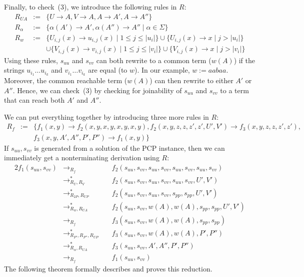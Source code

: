 \documentclass{LMCS}
\theoremstyle{plain}
\begin{document}
Finally, to check~(3), we introduce the following rules in $R$:
\begin{eqnarray}
R_{UA} & := & \{ U \rightarrow A, V \rightarrow A, A \rightarrow A', A\rightarrow A''\}
\nonumber
\\
R_\alpha & := &  \{ \alpha(A')\rightarrow A', \alpha(A'')\rightarrow A'' \mid \alpha\in\Sigma \}
\nonumber
\\
R_w & := & \{U_{i,j}(x)\rightarrow u_{i,j}(x) \mid 1\leq j\leq |u_i|\}
\cup \{U_{i,j}(x)\rightarrow x \mid j>|u_i|\}
\nonumber
\\ & & 
\cup \{V_{i,j}(x)\rightarrow v_{i,j}(x) \mid 1\leq j\leq |v_i|\}
\cup \{V_{i,j}(x)\rightarrow x \mid j>|v_i|\}
\label{eqn-ra}
\end{eqnarray}
Using these rules,
$s_{uu}$ and $s_{vv}$ can both rewrite to a common term 
($w(A)$) if
the strings 
$u_{i_1}\ldots u_{i_k}$ 
and
$v_{i_1}\ldots v_{i_k}$ are equal (to $w$).
In our example, $w := aabaa$.
Moreover, the common reachable term ($w(A)$) can then rewrite to either $A'$ or $A''$.
Hence, we can check~(3) by checking for joinability of $s_{uu}$ and
$s_{vv}$ to a term that can reach both $A'$ and $A''$.

We can put everything together by introducing three more rules in $R$:
\begin{eqnarray}
R_f & := & \{f_1(x,y)\rightarrow f_2(x,y,x,y,x,y,x,y), 
	f_2(x,y,z,z,z',z',U',V')\rightarrow f_3(x,y,z,z,z',z'), 
\nonumber
	\\ & & 
	f_3(x,y,A',A'',P',P'')\rightarrow f_1(x,y) \}
\label{eqn-rf}
\end{eqnarray}
If $s_{uu},s_{vv}$ is generated from a solution of the PCP instance, then
we can immediately get a nonterminating derivation using $R$:
\begin{alignat}{2} f_1(s_{uu},s_{vv}) & \rightarrow_{R_f} &\;&
	f_2(s_{uu},s_{vv},s_{uu},s_{vv},s_{uu},s_{vv},s_{uu},s_{vv})
\nonumber
\\ & \rightarrow_{R_U,R_V}^* &&
	f_2(s_{uu},s_{vv},s_{uu},s_{vv},s_{uu},s_{vv},U',V')
\nonumber
\\ & \rightarrow_{R_{2P},R_{UP}}^* &&
	f_2(s_{uu},s_{vv},s_{uu},s_{vv},s_{pp},s_{pp},U',V')
\nonumber
\\ & \rightarrow_{R_{w},R_{UA}}^* &&
	f_2(s_{uu},s_{vv},w(A),w(A),s_{pp},s_{pp},U',V')
\nonumber
\\ & \rightarrow_{R_{f}} &&
	f_3(s_{uu},s_{vv},w(A),w(A),s_{pp},s_{pp})
\nonumber
\\ & \rightarrow_{R_{P'},R_{P''},R_{UP}}^* &&
	f_3(s_{uu},s_{vv},w(A),w(A),P',P'')
\nonumber
\\ & \rightarrow_{R_{\alpha},R_{UA}}^* &&
	f_3(s_{uu},s_{vv},A',A'',P',P'')
\nonumber
\\ & \rightarrow_{R_{f}} &&
	f_1(s_{uu},s_{vv})
\label{eqn-infinite-derivation}
\end{alignat}
The following theorem formally describes and proves this reduction.
\end{document}
